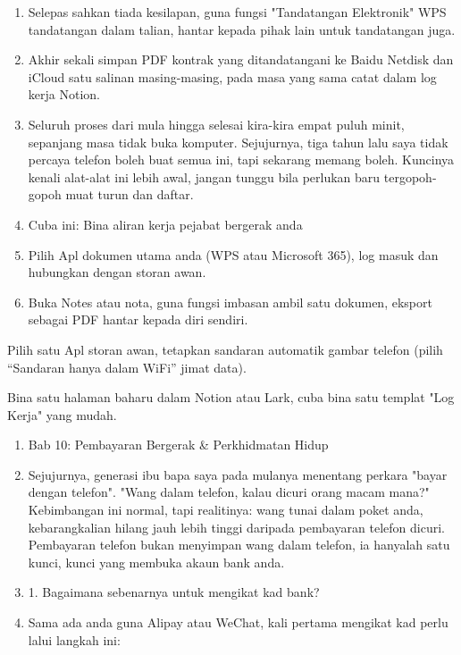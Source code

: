 \begin{enumerate}
  \item Selepas sahkan tiada kesilapan, guna fungsi "Tandatangan Elektronik" WPS tandatangan dalam talian, hantar kepada pihak lain untuk tandatangan juga.
  \item Akhir sekali simpan PDF kontrak yang ditandatangani ke Baidu Netdisk dan iCloud satu salinan masing-masing, pada masa yang sama catat dalam log kerja Notion.
  \item Seluruh proses dari mula hingga selesai kira-kira empat puluh minit, sepanjang masa tidak buka komputer. Sejujurnya, tiga tahun lalu saya tidak percaya telefon boleh buat semua ini, tapi sekarang memang boleh. Kuncinya kenali alat-alat ini lebih awal, jangan tunggu bila perlukan baru tergopoh-gopoh muat turun dan daftar.
  \item Cuba ini: Bina aliran kerja pejabat bergerak anda
  \item Pilih Apl dokumen utama anda (WPS atau Microsoft 365), log masuk dan hubungkan dengan storan awan.
  \item Buka Notes atau nota, guna fungsi imbasan ambil satu dokumen, eksport sebagai PDF hantar kepada diri sendiri.
\end{enumerate}

Pilih satu Apl storan awan, tetapkan sandaran automatik gambar telefon (pilih “Sandaran hanya dalam WiFi” jimat data).

\begin{tcbpractice}{Bina satu halaman baharu dalam Notion atau Lark, cuba bina satu templat "Log Kerja" yang mudah.}
\begin{enumerate}
  \item Bab 10: Pembayaran Bergerak \& Perkhidmatan Hidup
  \item Sejujurnya, generasi ibu bapa saya pada mulanya menentang perkara "bayar dengan telefon". "Wang dalam telefon, kalau dicuri orang macam mana?" Kebimbangan ini normal, tapi realitinya: wang tunai dalam poket anda, kebarangkalian hilang jauh lebih tinggi daripada pembayaran telefon dicuri. Pembayaran telefon bukan menyimpan wang dalam telefon, ia hanyalah satu kunci, kunci yang membuka akaun bank anda.
  \item 1. Bagaimana sebenarnya untuk mengikat kad bank?
  \item Sama ada anda guna Alipay atau WeChat, kali pertama mengikat kad perlu lalui langkah ini:
\end{enumerate}

\end{tcbpractice}
